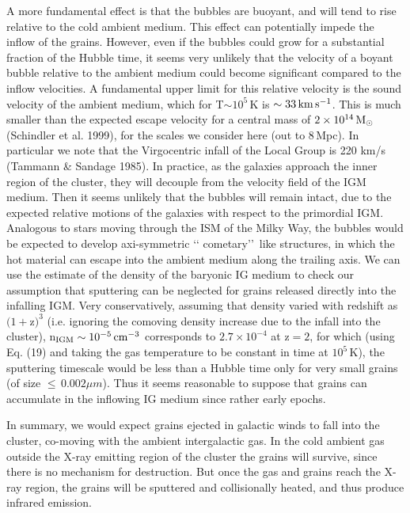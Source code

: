 \documentclass[]{aa}
\begin{document}
A more fundamental effect is that the bubbles are buoyant, and will tend to 
rise relative to the cold ambient medium. This effect can potentially impede
the inflow of the grains. However, even if the bubbles could grow for a 
substantial fraction of the Hubble time, it seems very
unlikely that the velocity of a boyant bubble relative to the ambient medium
could become significant compared to the inflow velocities. A
fundamental upper limit for this relative velocity is the sound velocity
of the ambient medium, which for T$\sim10^5$\,K is $\sim 33\,{\rm km}\,
{\rm s}^{-1}$. This is much smaller than the expected escape velocity for a 
central mass of $2\times 10^{14}\,{\rm M}_{\odot}$ (Schindler et al. 1999), 
for the scales we consider here (out to 8$\,$Mpc). In particular we note 
that the Virgocentric infall of the Local Group is 220 km/s 
(Tammann \& Sandage 1985). 
In practice, as the galaxies approach the inner region of the cluster, they
will decouple from the velocity field of the IGM medium. Then it seems 
unlikely that the bubbles will remain intact, due to the expected relative
motions of the galaxies with respect to the primordial IGM. Analogous to stars
moving through the ISM of the Milky Way, the bubbles would be expected to 
develop axi-symmetric \lq\lq
cometary\rq\rq\ like structures, in which the hot material can escape into the
ambient medium along the trailing axis. We can use the estimate of the
density of the baryonic IG medium to check our assumption that sputtering 
can be neglected for grains released directly into the infalling IGM. 
Very conservatively, assuming that density varied with redshift as $(1+$z$)^3$
(i.e. ignoring the comoving density increase due to the infall into the 
cluster), n$_{\rm IGM}\sim10^{-5}\,{\rm cm}^{-3}$ corresponds to
$2.7\times10^{-4}$ at z$=2$, for which (using Eq. (19) and taking the
gas temperature to be constant in time at $10^{5}$\,K), the sputtering
timescale would be less than a Hubble time only for very small grains
(of size $\leq\,0.002{\mu}m$). Thus it seems reasonable to suppose that
grains can accumulate in the inflowing IG medium since rather early epochs. 


In summary, we would expect grains ejected in galactic winds to fall into the
cluster, co-moving with the ambient intergalactic gas. In the cold ambient 
gas outside the 
X-ray emitting region of the cluster the grains will survive, since there is 
no mechanism for destruction. But once the gas and grains reach the X-ray 
region, 
the grains will be sputtered and collisionally heated, and thus 
produce infrared emission. 
\end{document}
